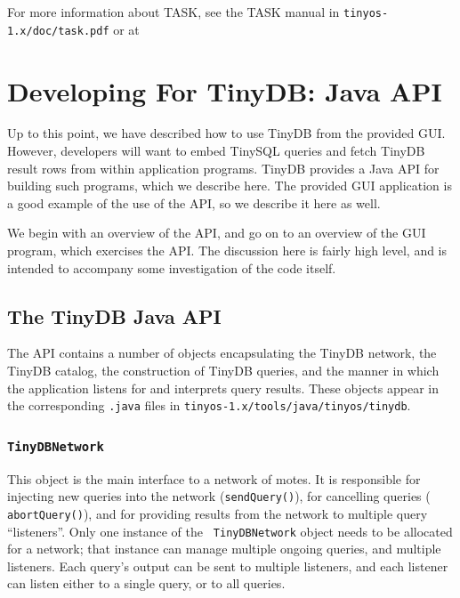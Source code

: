 \documentclass[11pt]{article}
\newcommand{\docroot}{tinyos-1.x}
\newcommand{\java}{tinyos-1.x/tools/java}
\begin{document}
For more information about TASK, see the TASK manual in
{\tt \docroot/doc/task.pdf} or at


\section{Developing For TinyDB: Java API}
\label{sec:devel}
Up to this point, we have described how to use TinyDB from the
provided GUI.  However, developers will want to embed TinySQL
queries and fetch TinyDB result rows from within application programs.
TinyDB provides a Java API for
building such programs, which we describe here.  The provided
GUI application is a good example of the use of the API,
so we describe it here as well.

We begin with an overview of the API, and go on to an
overview of the GUI program, which exercises the
API.  The discussion here is fairly high level, and is
intended to accompany some investigation of the code itself.

\subsection{The TinyDB Java API}
The API contains a number of objects encapsulating the
TinyDB network, the TinyDB catalog, the construction of TinyDB
queries, and the manner in which the application listens for and
interprets query results.  These objects appear in the corresponding
{\tt .java} files in {\tt \java/tinyos/tinydb}.

\subsubsection{\tt TinyDBNetwork} 
\label{sec:tinydbnet}

This object is the main interface to a
  network of motes.  It is responsible for injecting new queries into
  the network ({\tt sendQuery()}), for cancelling queries ({\tt
  abortQuery()}), and for providing results from the network to
  multiple query ``listeners''.  Only one instance of the {\tt
  TinyDBNetwork} object needs to be allocated for a network; that
  instance can manage multiple ongoing queries, and multiple
  listeners.  Each query's output can be sent to multiple listeners,
  and each listener can listen either to a single query, or to all
  queries.
  
\end{document}
